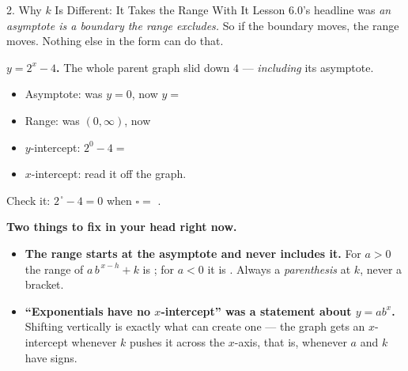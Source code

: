 \documentclass[10pt]{article}
\newcommand{\lgrid}[4]{%
  \draw[step=1, linegray!40, very thin] (#1,#3) grid (#2,#4);
  \draw[->, semithick, charcoal] (#1,0)--(#2,0) node[below right, font=\scriptsize]{$x$};
  \draw[->, semithick, charcoal] (0,#3)--(0,#4) node[left, font=\scriptsize]{$y$};}
\newcommand{\expgraph}[6]{\draw[very thick, forest, domain=#5:#6, samples=140, smooth]
  plot (\x,{(#1)*exp((#2)*((\x)-(#3)))+(#4)});}
\newcommand{\hasym}[3]{\draw[navy, dashed, semithick] (#1,#3)--(#2,#3);}
\begin{document}
\begin{notesbox}{2. Why $k$ Is Different: It Takes the Range With It}
Lesson 6.0's headline was \emph{an asymptote is a boundary the range excludes.} So if the boundary
moves, the range moves. Nothing else in the form can do that.
\begin{center}
\begin{minipage}[c]{0.44\linewidth}
\centering
{}
\end{minipage}
\begin{minipage}[c]{0.52\linewidth}
\small
\textbf{$y=2^{x}-4$.} The whole parent graph slid down $4$ --- \emph{including} its asymptote.
\begin{itemize}[leftmargin=1.3em, itemsep=3pt]
  \item Asymptote: was $y=0$, now $y=$ \blank{1.2cm}
  \item Range: was $(0,\infty)$, now \blank{2.4cm}
  \item $y$-intercept: $2^{0}-4=$ \blank{1.4cm}
  \item $x$-intercept: read it off the graph. \blank{1.6cm}
\end{itemize}
Check it: $2^{\,\square}-4=0$ when $\square=$ \blank{1.0cm}. \checkmark
\end{minipage}
\end{center}

\vspace{3pt}
\begin{tcolorbox}[colback=redbg, colframe=redacc, boxrule=0.8pt, arc=1.5mm,
    left=2.5mm, right=2.5mm, top=1.5mm, bottom=1.5mm]
\textbf{Two things to fix in your head right now.}
\begin{itemize}[leftmargin=1.4em, itemsep=2pt]
  \item \textbf{The range starts at the asymptote and never includes it.} For $a>0$ the range of
        $a\,b^{\,x-h}+k$ is \blank{2.4cm}; for $a<0$ it is \blank{2.6cm}. Always a
        \emph{parenthesis} at $k$, never a bracket.
  \item \textbf{``Exponentials have no $x$-intercept'' was a statement about $y=ab^{x}$.} Shifting
        vertically is exactly what can create one --- the graph gets an $x$-intercept whenever $k$
        pushes it across the $x$-axis, that is, whenever $a$ and $k$ have \blank{2.4cm} signs.
\end{itemize}
\end{tcolorbox}


\end{notesbox}
\end{document}

